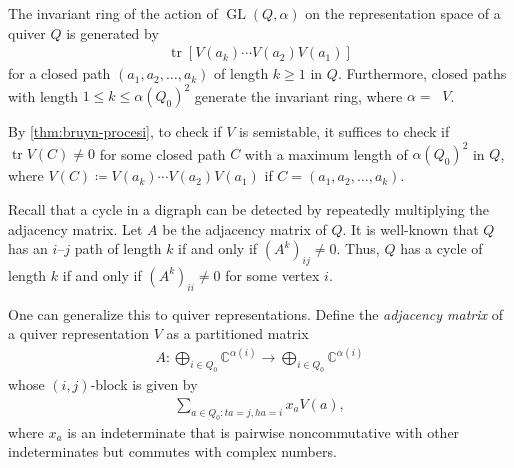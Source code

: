 \documentclass[a4paper,11pt]{article}
\numberwithin{equation}{section}
\newcommand{\C}{\mathbb{C}}
\DeclareMathOperator{\GL}{GL}
\DeclareMathOperator{\tr}{tr}
\DeclareMathOperator{\dimv}{\underline{dim}}
\begin{document}
\begin{theorem}\label{thm:bruyn-procesi}
    The invariant ring of the action of $\GL(Q, \alpha)$ on the representation space of a quiver $Q$ is generated by 
    \begin{align}
        \tr[V(a_k)\cdots V(a_2) V(a_1)]
    \end{align}
    for a closed path $(a_1, a_2, \dots, a_k)$ of length $k \ge 1$ in $Q$.
    Furthermore, closed paths with length $1 \le k \leq \alpha(Q_0)^2$ generate the invariant ring, where $\alpha = \dimv V$.
\end{theorem}

By \cref{thm:bruyn-procesi}, to check if $V$ is semistable, it suffices to check if $\tr V(C) \neq 0$ for some closed path $C$ with a maximum length of ${\alpha(Q_0)}^2$ in $Q$, where $V(C) \coloneqq V(a_k) \dotsb V(a_2)  V(a_1)$ if $C = (a_1, a_2, \dots, a_k)$.

Recall that a cycle in a digraph can be detected by repeatedly multiplying the adjacency matrix.
Let $A$ be the adjacency matrix of $Q$.
It is well-known that $Q$ has an $i$--$j$ path of length $k$ if and only if $(A^k)_{ij} \neq 0$.
Thus, $Q$ has a cycle of length $k$ if and only if $(A^k)_{ii} \neq 0$ for some vertex $i$.

One can generalize this to quiver representations.
Define the \emph{adjacency matrix} of a quiver representation $V$ as a partitioned matrix
\begin{align}
    A: \bigoplus_{i \in Q_0} \C^{\alpha(i)} \to \bigoplus_{i \in Q_0} \C^{\alpha(i)}
\end{align}
whose $(i,j)$-block is given by 
\begin{align}\label{eq:adj-matrix}
    \sum_{a \in Q_0: ta=j, ha=i} x_a V(a),
\end{align}
where $x_a$ is an indeterminate that is pairwise noncommutative with other indeterminates but commutes with complex numbers.
\end{document}
